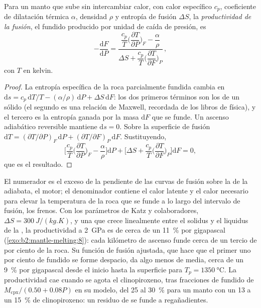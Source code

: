 \begin{proposition}\label{prop:b2:mantle-melting:productivity}
Para un manto que sube sin intercambiar calor, con calor específico $c_p$, coeficiente de
dilatación térmica $\alpha$, densidad $\rho$ y entropía de fusión $\Delta S$, la
\emph{productividad de la fusión}, el fundido producido por unidad de caída de
presión, es
\[
  -\frac{\mathrm dF}{\mathrm dP} =
  \frac{\dfrac{c_p}{T}\Big(\dfrac{\partial T}{\partial P}\Big)_F - \dfrac{\alpha}{\rho}}
       {\Delta S + \dfrac{c_p}{T}\Big(\dfrac{\partial T}{\partial F}\Big)_P}\,,
\]
con $T$ en kelvin.
\end{proposition}

\begin{proof}
La entropía específica de la roca parcialmente fundida cambia en $\mathrm ds = c_p\,
\mathrm dT/T - (\alpha/\rho)\,\mathrm dP + \Delta S\,\mathrm dF$: los dos primeros
términos son los de un sólido (el segundo es una relación de Maxwell, recordada de los
libros de física), y el tercero es la entropía ganada por la masa $\mathrm dF$ que
se funde. Un ascenso adiabático reversible mantiene $\mathrm ds = 0$. Sobre la superficie de
fusión $\mathrm dT = (\partial T/\partial P)_F\,\mathrm dP + (\partial
T/\partial F)_P\,\mathrm dF$. Sustituyendo,
\[
  \Big[\frac{c_p}{T}\Big(\frac{\partial T}{\partial P}\Big)_F - \frac{\alpha}{\rho}\Big]\mathrm dP
  + \Big[\Delta S + \frac{c_p}{T}\Big(\frac{\partial T}{\partial F}\Big)_P\Big]\mathrm dF = 0,
\]
que es el resultado.
\end{proof}

El numerador es el exceso de la pendiente de las curvas de fusión sobre la de la adiabata, el
motor; el denominador contiene el calor latente y el calor necesario para elevar la
temperatura de la roca que se funde a lo largo del intervalo de fusión, los frenos. Con los
parámetros de Katz y colaboradores, $\Delta S = \qty{300}{J/(kg.K)}$, y una 
que crece linealmente entre el solidus y el liquidus de la , la
productividad a \qty{2}{GPa} es de cerca de un \qty{11}{\percent} por gigapascal
(\cref{exo:b2:mantle-melting:8}): cada kilómetro de ascenso funde cerca de un tercio de por ciento de la
roca. Su función de fusión ajustada, que hace que el primer uno por ciento de fundido se forme
despacio, da algo menos de media, cerca de un \qty{9}{\percent} por gigapascal
desde el inicio hasta la superficie para $T_p = \qty{1350}{\celsius}$. La productividad
cae cuando se agota el clinopiroxeno, tras fracciones de fundido de
$M_{\mathrm{cpx}}/(0.50 + 0.08P)$ en su modelo, del 25 al \qty{30}{\percent} para
un manto con un 13 a un \qty{15}{\percent} de clinopiroxeno: un residuo de  se funde
a regañadientes.

